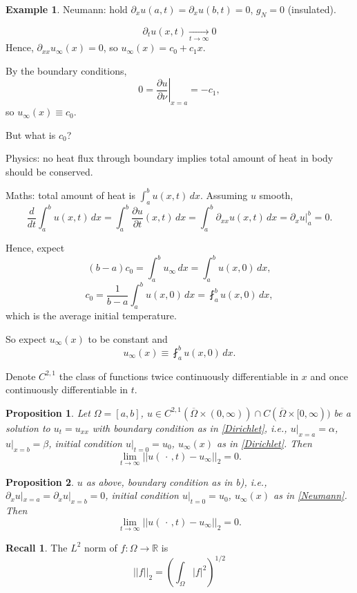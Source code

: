 \documentclass[12pt]{article}
\newtheorem{proposition}{Proposition}[section]
\theoremstyle{definition}
\newtheorem*{recall}{Recall}
\newtheorem*{example*}{Example}
\begin{document}
\begin{example*}
Neumann: hold $\partial_xu(a,t)=\partial_xu(b,t)=0$, $g_N=0$ (insulated).

\[\partial_tu(x,t)\xrightarrow[t\to\infty]{}0\]
Hence, $\partial_{xx}u_{\infty}(x)=0$, so $u_{\infty}(x)=c_0+c_1x$.

By the boundary conditions,
\[0=\left.\frac{\partial u}{\partial\nu}\right|_{x=a}=-c_1,\]
so $u_{\infty}(x)\equiv c_0$.

But what is $c_0$?

Physics: no heat flux through boundary implies total amount of heat in body should be conserved.

Maths: total amount of heat is $\int_a^bu(x,t)\,dx$. Assuming $u$ smooth,
\[\frac{d}{dt}\int_a^bu(x,t)\,dx=\int_a^b\frac{\partial u}{\partial t}(x,t)\,dx=\int_a^b\partial_{xx}u(x,t)\,dx=\partial_xu\Big|_a^b=0.\]

Hence, expect
\[(b-a)c_0=\int_a^bu_{\infty}\,dx=\int_a^bu(x,0)\,dx,\]
\[c_0=\frac{1}{b-a}\int_a^bu(x,0)\,dx=\fint_a^bu(x,0)\,dx,\]
which is the average initial temperature.

So expect $u_{\infty}(x)$ to be constant and
\[u_{\infty}(x)\equiv\fint_a^bu(x,0)\,dx.\]
\end{example*}

Denote $C^{2,1}$ the class of functions twice continuously differentiable in $x$ and once continuously differentiable in $t$.

\begin{proposition}\label{lim0_Dirichlet}
Let $\Omega=[a,b]$, $u\in C^{2,1}(\overline{\Omega}\times(0,\infty))\cap C(\overline{\Omega}\times[0,\infty))$ be a solution to $u_t=u_{xx}$ with boundary condition as in \ref{Dirichlet}, i.e., $u|_{x=a}=\alpha$, $u|_{x=b}=\beta$, initial condition $u|_{t=0}=u_0$, $u_{\infty}(x)$ as in \ref{Dirichlet}. Then
\[\lim_{t\to\infty}||u(\,\cdot\,,t)-u_{\infty}||_2=0.\]
\end{proposition}

\begin{proposition}\label{lim0_Neumann}
$u$ as above, boundary condition as in b), i.e., $\partial_xu|_{x=a}=\partial_xu|_{x=b}=0$, initial condition $u|_{t=0}=u_0$, $u_{\infty}(x)$ as in \ref{Neumann}. Then
\[\lim_{t\to\infty}||u(\,\cdot\,,t)-u_{\infty}||_2=0.\]
\end{proposition}

\begin{recall}
The $L^2$ norm of $f:\Omega\rightarrow\mathbb{R}$ is
\[||f||_2=\left(\int_{\Omega}|f|^2\right)^{1/2}\]
\end{recall}
\end{document}
